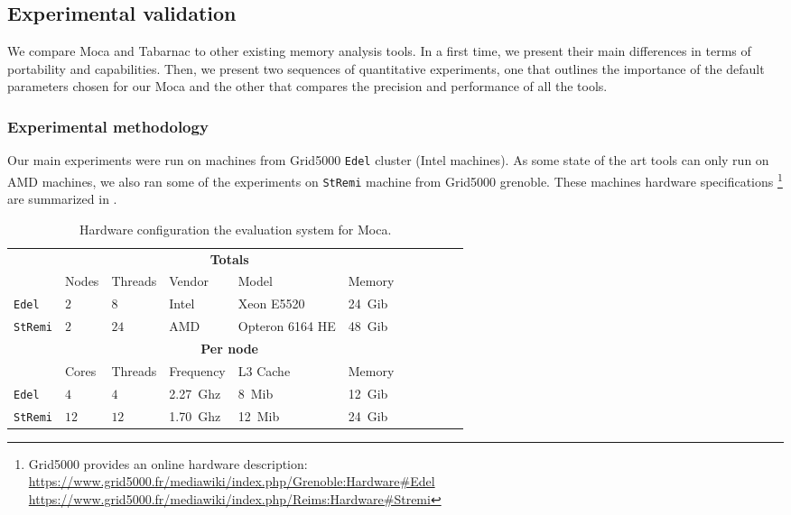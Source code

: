 \subsection{Experimental validation}
\label{sec:Tools-Comp}

We compare \gls{Moca} and \gls{Tabarnac} to other existing memory analysis tools.
In a first time, we present their main differences in terms of portability and capabilities.
Then, we present two sequences of quantitative experiments, one that outlines the importance of the default parameters chosen for our \gls{Moca} and the other that compares the precision and performance of all the tools.

\subsubsection{Experimental methodology}

Our main experiments were run on  machines from \gls{Grid5000} \texttt{Edel}
cluster (Intel machines).
As some state of the art tools can only run on \gls{AMD} machines, we also ran
    some of the experiments on
    \texttt{StRemi} machine from \gls{Grid5000} grenoble.
    These machines hardware specifications%
    \footnote{\gls{Grid5000} provides an online hardware description:\\
       \url{https://www.grid5000.fr/mediawiki/index.php/Grenoble:Hardware\#Edel}
       \\\url{https://www.grid5000.fr/mediawiki/index.php/Reims:Hardware\#Stremi}}
    are summarized in .

\begin{table}[htb]
    \centering
    \begin{tabular}{lllllllllll}
        \toprule
        & \multicolumn{5}{c}{\textbf{Totals}}\\
        \cmidrule(lr){2-6}
        & Nodes & Threads & Vendor & Model & Memory \\
        \cmidrule(lr){2-6}
        \texttt{Edel}    & $2$ & $8$  & Intel & Xeon E5520      & \SI{24}{Gib} \\
        \texttt{StRemi} & $2$ & $24$ & AMD   & Opteron 6164 HE & \SI{48}{Gib} \\
        \midrule
        & \multicolumn{5}{c}{\textbf{Per node}}\\
        \cmidrule(lr){2-6}
        & Cores & Threads & Frequency & L3 Cache & Memory \\
        \cmidrule(lr){2-6}
        \texttt{Edel}   & $4$  & $4$   & \SI{2.27}{Ghz}& \SI{8}{Mib}  & \SI{12}{Gib} \\
        \texttt{StRemi} & $12$ & $12$  & \SI{1.70}{Ghz}& \SI{12}{Mib} & \SI{24}{Gib}\\
        \bottomrule
    \end{tabular}
    \caption{Hardware configuration the evaluation system for Moca.}
    \label{tab:hw-moca}
\end{table}


